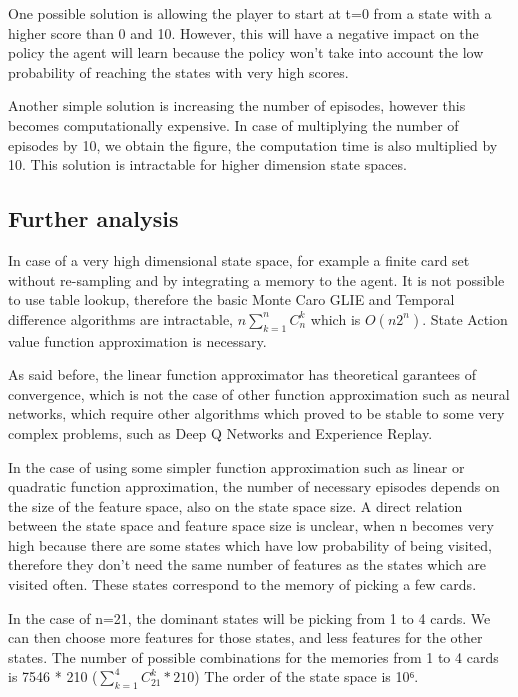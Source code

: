 \documentclass[12pt,a4paper]{article}
\begin{document}
{One possible solution is allowing the player to start at t=0 from a state with a higher score than 0 and 10. However, this will have a negative impact on the policy the agent will learn because the policy won't take into account the low probability of reaching the states with very high scores.

Another simple solution is increasing the number of episodes, however this becomes computationally expensive. In case of multiplying the number of episodes by 10, we obtain the figure, the computation time is also multiplied by 10. This solution is intractable for higher dimension state spaces. 

\subsection{Further analysis}
In case of a very high dimensional state space, for example a finite card set without re-sampling and by integrating a memory to the agent.
It is not possible to use table lookup, therefore the basic Monte Caro GLIE and Temporal difference algorithms are intractable, $n \sum_{k=1}^{n}{C_n^k}$ which is $O(n2^n)$. State Action value function approximation is necessary.

As said before, the linear function approximator has theoretical garantees of convergence, which is not the case of other function approximation such as neural networks, which require other algorithms which proved to be stable to some very complex problems, such as Deep Q Networks and Experience Replay\cite{mnih-dqn-2015}.

In the case of using some simpler function approximation such as linear or quadratic function approximation, the number of necessary episodes depends on the size of the feature space, also on the state space size. A direct relation between the state space and feature space size is unclear, when n becomes very high because there are some states which have low probability of being visited, therefore they don't need the same number of features as the states which are visited often. These states correspond to the memory of picking a few cards.

In the case of n=21, the dominant states will be picking from 1 to 4 cards. We can then choose more features for those states, and less features for the other states. The number of possible combinations for the memories from 1 to 4 cards is 7546 * 210 ($\sum_{k=1}^{4}{C_21^k} * 210$) The order of the state space is 10⁶. 




}
\end{document}
